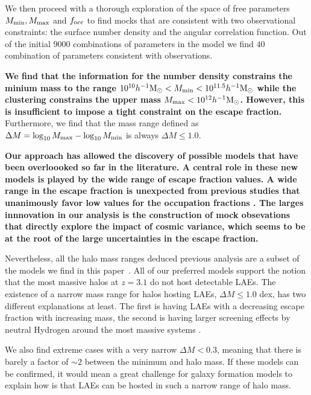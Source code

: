 \documentclass[usenatbib]{mn2e}
\newcommand{\documentname}{paper~}
\newcommand{\ly}{{\ifmmode{{\rm Ly}\alpha}\else{Ly$\alpha$~}\fi}}
\newcommand{\hMsun}{{\ifmmode{h^{-1}{\rm
        {M_{\odot}}}}\else{$h^{-1}{\rm{M_{\odot}}}$}\fi}}
\begin{document}
We then proceed with a
thorough exploration of the space of free parameters $M_{\rm min},
M_{\rm max}$ and $f_{\rm occ}$ to find mocks that are consistent with
two observational constraints: the surface number density and the
angular correlation function. Out of the initial $9000$ 
combinations of parameters in the model we find $40$ combination of parameters
consistent with observations.

{\bf We find that the information for the number density constrains
  the minium mass to the range
  $10^{10}\hMsun < M_{\rm min} < 10^{11.5}\hMsun$ while the clustering
  constrains the upper mass $M_{\rm    max} < 10^{12}\hMsun$. However,
  this is insufficient to impose a tight constraint  on the escape
  fraction.} Furthermore, we find that the mass range defined as
$\Delta M=\log_{10}M_{\rm max} - \log_{10}M_{\rm min}$ is always
$\Delta M\leq 1.0$. 

{\bf Our approach has allowed the discovery of possible models that have
been overloooked so far in the literature. A central role in these new
models is played by the wide range of escape fraction values. A wide
range in the escape fraction is unexpected from previous studies that
unanimously favor low values for the occupation
fractions \citep[i.e.][]{Gawiser2007,Ouchi2010}. The larges
innnovation in our analysis is the construction of mock obsevations
that directly explore the impact of cosmic variance, which seems to be
at the root of the large uncertainties in the escape fraction.}

Nevertheless, all the halo mass ranges deduced previous analysis are a
subset of the models we find in this \documentname.  All of our
preferred models support the notion that the most massive halos at
$z=3.1$ do not host detectable LAEs. The existence of a narrow mass
range for halos hosting LAEs, $\Delta  M\leq 1.0$ dex, has two
different explanations at least. The first is having LAEs with a
decreasing \ly escape fraction with increasing mass, the second is
having larger screening effects by neutral Hydrogen around the most
massive systems \citep{Laursen2009,ForeroRomero2011}.    

We also find extreme cases with a very narrow $\Delta M<0.3$, meaning that
there is barely a factor of $\sim 2$ between the minimum and halo
mass. If these models can be confirmed, it would mean a great
challenge for galaxy formation models to explain how is that LAEs can
be hosted in such a narrow range of halo mass.  
\end{document}
